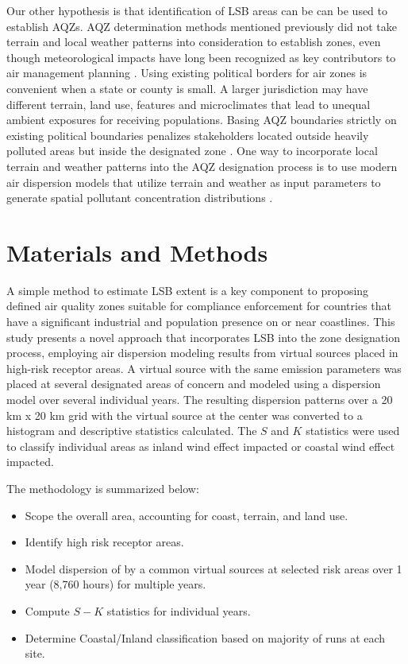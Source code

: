 Our other hypothesis is that identification of LSB areas can be can be used to establish AQZs.  AQZ determination methods mentioned previously did not take terrain and local weather patterns into consideration to establish zones, even though meteorological impacts have long been recognized as key contributors to air management planning \citep{Leavitt1960}.  Using existing political borders for air zones is convenient when a state or county is small.  A larger jurisdiction may have different terrain, land use, features and microclimates that lead to unequal ambient exposures for receiving populations.  Basing AQZ boundaries strictly on existing political boundaries penalizes stakeholders located outside heavily polluted areas but inside the designated zone \citep{Carr2012}.  One way to incorporate local terrain and weather patterns into the AQZ designation process is to use modern air dispersion models that utilize terrain and weather as input parameters to generate spatial pollutant concentration distributions \citep{Ghannam2013b, Irwin2014}. 

\section{Materials and Methods}
A simple method to estimate LSB extent is a key component to proposing defined air quality zones suitable for compliance enforcement for countries that have a significant industrial and population presence on or near coastlines.  This study presents a novel approach that incorporates LSB into the zone designation process, employing air dispersion modeling results from virtual sources placed in high-risk receptor areas.  A virtual source with the same emission parameters was placed at several designated areas of concern and modeled using a dispersion model over several individual years.  The resulting dispersion patterns over a 20 km x 20 km grid with the virtual source at the center was converted to a histogram and descriptive statistics calculated.  The $S$ and $K$ statistics were used to classify individual areas as inland wind effect impacted or coastal wind effect impacted.

The methodology is summarized below:
\begin{itemize}
\item Scope the overall area, accounting for coast, terrain, and land use.
\item Identify high risk receptor areas.
\item Model dispersion of by a common virtual sources at selected risk areas over 1 year (8,760 hours) for multiple years.
\item Compute $S-K$ statistics for individual years.
\item Determine Coastal/Inland classification based on majority of runs at each site.
\end{itemize}


